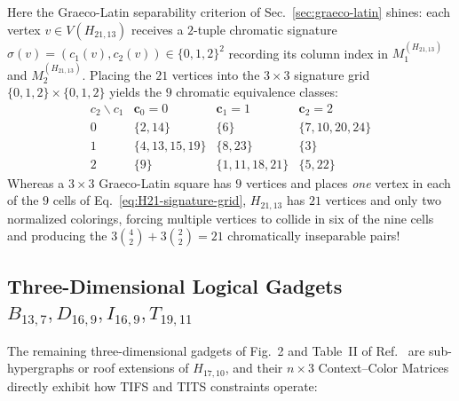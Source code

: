 \documentclass[aps,pra,reprint,superscriptaddress,longbibliography,nofootinbib,floatfix,10pt]{revtex4-2}
\theoremstyle{definition}\newtheorem{definition}[theorem]{Definition}
\theoremstyle{remark}\newtheorem{remark}[theorem]{Remark}
\begin{document}
Here the Graeco-Latin separability criterion of Sec.~\ref{sec:graeco-latin} shines: each vertex $v\in V(H_{21,13})$ receives a $2$-tuple chromatic signature $\sigma(v)=(c_1(v),c_2(v))\in\{0,1,2\}^2$ recording its column index in $M_1^{(H_{21,13})}$ and $M_2^{(H_{21,13})}$. Placing the $21$ vertices into the $3\times 3$ signature grid $\{0,1,2\}\times\{0,1,2\}$ yields the $9$ chromatic equivalence classes:
\begin{equation}\label{eq:H21-signature-grid}
\begin{array}{c|ccc}
c_2\backslash c_1 & \mathbf{c}_0=0 & \mathbf{c}_1=1 & \mathbf{c}_2=2\\\hline
0 & \{2,14\} & \{6\} & \{7,10,20,24\}\\
1 & \{4,13,15,19\} & \{8,23\} & \{3\}\\
2 & \{9\} & \{1,11,18,21\} & \{5,22\}
\end{array}
\end{equation}
Whereas a $3\times 3$ Graeco-Latin square has $9$ vertices and places \emph{one} vertex in each of the $9$ cells of Eq.~\eqref{eq:H21-signature-grid}, $H_{21,13}$ has $21$ vertices and only two normalized colorings, forcing multiple vertices to collide in six of the nine cells and producing the $3\binom{4}{2}+3\binom{2}{2}=21$ chromatically inseparable pairs!

\subsection{Three-Dimensional Logical Gadgets \texorpdfstring{$B_{13,7},D_{16,9},I_{16,9},T_{19,11}$}{B13,7, D16,9, I16,9, T19,11}}\label{sec:3d-gadgets}

The remaining three-dimensional gadgets of Fig.~2 and Table~II of Ref.~\cite{svozil-2025-color} are sub-hypergraphs or roof extensions of $H_{17,10}$, and their $n\times 3$ Context--Color Matrices directly exhibit how TIFS and TITS constraints operate:
\end{document}
